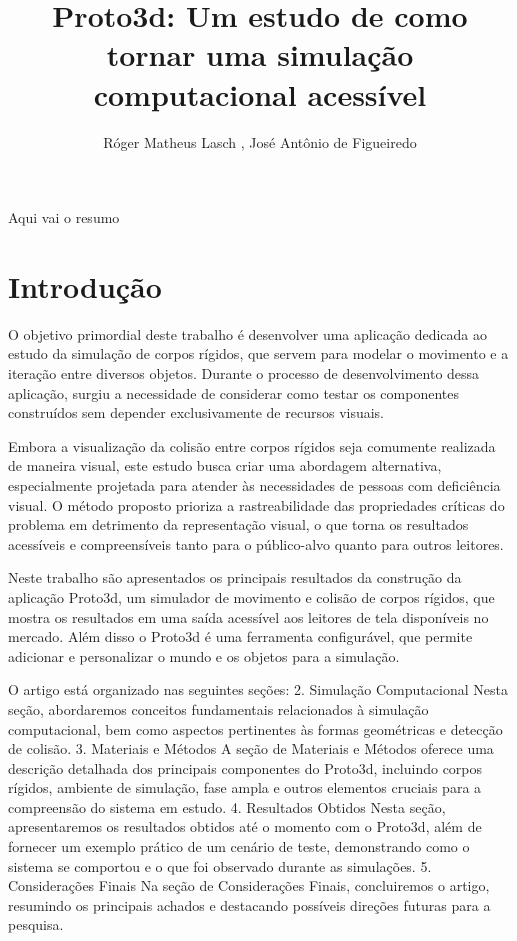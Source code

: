 \documentclass[12pt]{article}
\title{Proto3d: Um estudo de como tornar uma simulação computacional acessível}
\author{Róger Matheus Lasch \inst{1}, José Antônio de Figueiredo\inst{1}}
\begin{document}
 

\maketitle

\begin{abstract}
\end{abstract}
     
\begin{resumo} 
  Aqui vai o resumo
\end{resumo}

\section{Introdução}

O objetivo primordial deste trabalho é desenvolver uma aplicação dedicada ao estudo da simulação de corpos rígidos, que servem para modelar o movimento e a iteração entre diversos objetos. Durante o processo de desenvolvimento dessa aplicação, surgiu a necessidade de considerar como testar os componentes construídos sem depender exclusivamente de recursos visuais.

Embora a visualização da colisão entre corpos rígidos seja  comumente realizada de maneira visual, este estudo busca criar uma abordagem alternativa, especialmente projetada para atender às necessidades de pessoas com deficiência visual. O método proposto prioriza a rastreabilidade das propriedades críticas do problema em detrimento da representação visual, o que torna os resultados acessíveis e compreensíveis tanto para o público-alvo quanto para outros leitores.

Neste trabalho são apresentados os principais resultados da construção da aplicação Proto3d, um simulador de movimento e colisão de corpos rígidos, que mostra os resultados em uma saída acessível aos leitores de tela disponíveis no mercado. Além disso o Proto3d é uma ferramenta configurável, que permite adicionar e personalizar o mundo e os objetos para a simulação.

O artigo está organizado nas seguintes seções:
2. Simulação Computacional
Nesta seção, abordaremos conceitos fundamentais relacionados à simulação computacional, bem como aspectos pertinentes às formas geométricas e detecção de colisão.
3. Materiais e Métodos
A seção de Materiais e Métodos oferece uma descrição detalhada dos principais componentes do Proto3d, incluindo corpos rígidos, ambiente de simulação, fase ampla e outros elementos cruciais para a compreensão do sistema em estudo.
4. Resultados Obtidos
Nesta seção, apresentaremos os resultados obtidos até o momento com o Proto3d, além de fornecer um exemplo prático de um cenário de teste, demonstrando como o sistema se comportou e o que foi observado durante as simulações.
5. Considerações Finais
Na seção de Considerações Finais, concluiremos o artigo, resumindo os principais achados e destacando possíveis direções futuras para a pesquisa.
\end{document}
